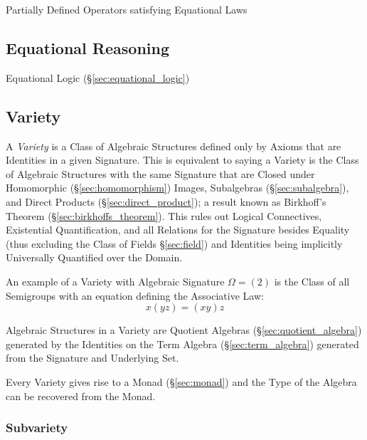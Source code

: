 Partially Defined Operators satisfying Equational Laws



\subsection{Equational Reasoning}\label{sec:equational_reasoning}

Equational Logic (\S\ref{sec:equational_logic})



\subsection{Variety}\label{sec:variety}

A \emph{Variety} is a Class of Algebraic Structures defined only by
Axioms that are Identities in a given Signature. This is equivalent to
saying a Variety is the Class of Algebraic Structures with the same
Signature that are Closed under Homomorphic (\S\ref{sec:homomorphism})
Images, Subalgebras (\S\ref{sec:subalgebra}), and Direct Products
(\S\ref{sec:direct_product}); a result known as Birkhoff's Theorem
(\S\ref{sec:birkhoffs_theorem}). This rules out Logical Connectives,
Existential Quantification, and all Relations for the Signature
besides Equality (thus excluding the Class of Fields
\S\ref{sec:field}) and Identities being implicitly Universally
Quantified over the Domain.

An example of a Variety with Algebraic Signature $\Omega = (2)$ is the
Class of all Semigroups with an equation defining the Associative Law:
\[
    x(yz) = (xy)z
\]

Algebraic Structures in a Variety are Quotient Algebras
(\S\ref{sec:quotient_algebra}) generated by the Identities on the Term
Algebra (\S\ref{sec:term_algebra}) generated from the Signature and
Underlying Set.

Every Variety gives rise to a Monad (\S\ref{sec:monad}) and the Type
of the Algebra can be recovered from the Monad.



\subsubsection{Subvariety}\label{sec:subvariety_theorem}

